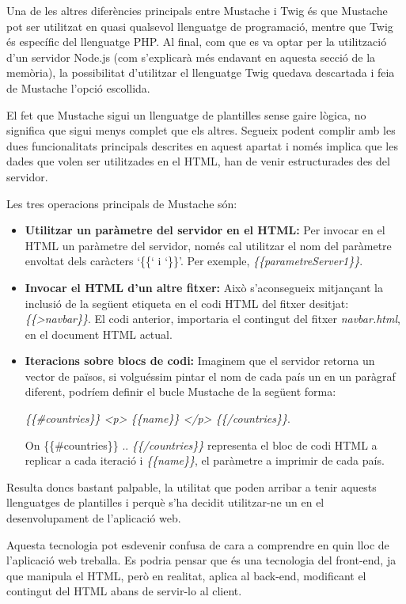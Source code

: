     Una de les altres diferències principals entre Mustache i Twig és que Mustache pot ser utilitzat en quasi qualsevol llenguatge de programació, mentre que Twig és específic del llenguatge PHP. Al final, com que es va optar per la utilització d'un servidor Node.js (com s'explicarà més endavant en aquesta secció de la memòria), la possibilitat d'utilitzar el llenguatge Twig quedava descartada i feia de Mustache l’opció escollida.

    El fet que Mustache sigui un llenguatge de plantilles sense gaire lògica, no significa que sigui menys complet que els altres. Segueix podent complir amb les dues funcionalitats principals descrites en aquest apartat i només implica que les dades que volen ser utilitzades en el HTML, han de venir estructurades des del servidor.

    Les tres operacions principals de Mustache són:

    \begin{itemize}
        \item \textbf{Utilitzar un paràmetre del servidor en el HTML:} Per invocar en el HTML un paràmetre del servidor, només cal utilitzar el nom del paràmetre envoltat dels caràcters `\{\{‘ i `\}\}’. Per exemple, \emph{\{\{parametreServer1\}\}}.
        \item \textbf{Invocar el HTML d'un altre fitxer:} Això s'aconsegueix mitjançant la inclusió de la següent etiqueta en el codi HTML del fitxer desitjat: \emph{\{\{>navbar\}\}}. El codi anterior, importaria el contingut del fitxer \emph{navbar.html}, en el do\-cu\-ment HTML actual.
        \item \textbf{Iteracions sobre blocs de codi:} Imaginem que el servidor retorna un vector de països, si volguéssim pintar el nom de cada país un en un paràgraf diferent, podríem definir el bucle Mustache de la següent forma:

        \emph{\{\{\#countries\}\} <p> \{\{name\}\} </p> \{\{/countries\}\}}.

        On \{\{\#countries\}\} .. \emph{\{\{/countries\}\}} representa el bloc de codi HTML a replicar a cada iteració i \emph{\{\{name\}\}}, el paràmetre a imprimir de cada país.
    \end{itemize}

    Resulta doncs bastant palpable, la utilitat que poden arribar a tenir aquests llenguatges de plantilles i perquè s'ha decidit utilitzar-ne un en el desenvolupament de l'aplicació web.

    Aquesta tecnologia pot esdevenir confusa de cara a comprendre en quin lloc de l’aplicació web treballa. Es podria pensar que és una tecnologia del front-end, ja que manipula el HTML, però en realitat, aplica al back-end, modificant el contingut del HTML abans de servir-lo al client.

